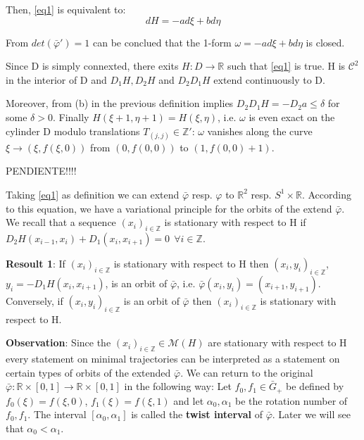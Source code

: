 \documentclass{article}
\begin{document}
Then, \ref{eq1} is equivalent to:
$$
	dH = - a d \xi + b d \eta
$$


\noindent From $det( \bar{\varphi}' ) = 1$ can be conclued that the 1-form $\omega = -a d \xi + b d \eta$ is closed.

\noindent Since D is simply connexted, there exits $H: D \rightarrow \mathbb{R}$ such that \ref{eq1} is true. H is $\mathcal{C}^{2}$ in the interior of D and $D_1 H, D_2 H$ and $D_2 D_1 H$ extend continuously to D.  

\noindent Moreover, from (b) in the previous definition implies $D_2 D_1 H = -D_2 a \leq \delta$ for some $\delta > 0$. Finally $H( \xi + 1, \eta + 1) = H(\xi, \eta)$, i.e. $\omega$ is even exact on the cylinder D modulo translations $T_{ (j, j) } \in \mathbb{Z}' $: $\omega$ vanishes along the curve $\xi \rightarrow ( \xi, f(\xi, 0))$ from $(0, f(0, 0))$ to $(1, f(0, 0) + 1)$. 

\noindent PENDIENTE!!!!

\noindent Taking \ref{eq1}  as definition we can extend $\bar{\varphi}$ resp. $\varphi$ to $\mathbb{R}^2$ resp. $S^1 \times \mathbb{R}$. According to this equation, we have a variational principle for the orbits of the extend $\bar{\varphi}$. We recall that a sequence $(x_{i})_{i \in \mathbb{Z}}$ is stationary with respect to H if $D_2 H (x_{i - 1}, x_{i}) + D_1 (x_i, x_{i + 1}) = 0 \ \ \forall i \in \mathbb{Z}$.

\noindent \textbf{Resoult 1}: If $(x_{i})_{i \in \mathbb{Z}}$ is stationary with respect to H then $(x_{i}, y_{i})_{i \in \mathbb{Z}}$, $y_i = - D_{1} H(x_i, x_{i + 1} )$, is an orbit of $\bar{\varphi}$, i.e. $\bar{\varphi}(x_i, y_i) = (x_{i + 1}, y_{i + 1})$. Conversely, if $(x_{i}, y_{i})_{i \in \mathbb{Z}}$ is an orbit of $\bar{\varphi}$ then $(x_{i})_{i \in \mathbb{Z}}$  is stationary with respect to H.


\noindent \textbf{Observation}: Since the $(x_i)_{i \in \mathbb{Z}} \in \mathcal{M} (H)$ are stationary with respect to H every statement on minimal trajectories can be interpreted as a statement on certain types of orbits of the extended $\bar{\varphi}$. We can return to the original $\bar{\varphi}: \mathbb{R} \times [0, 1] \rightarrow \mathbb{R} \times [0, 1]$ in the following way: Let $f_0, f_1 \in 	\bar{G}_{+}$ be defined by $f_{0} (\xi) = f(\xi, 0)$, $f_{1} (\xi) = f(\xi, 1)$ and let $\alpha_0, \alpha_1$ be the rotation number of $f_0, f_1$. The interval $[ \alpha_0, \alpha_1 ]$ is called the \textbf{twist interval} of $\bar{\varphi}$. Later we will see that $\alpha_0 < \alpha_1$.
\end{document}
